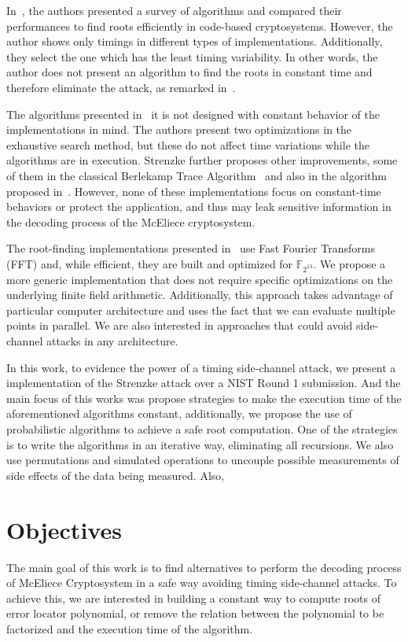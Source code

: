 In~\cite{strenzke2012fast}, the authors presented a survey of algorithms and compared their performances to find roots efficiently in code-based cryptosystems. However, the author shows only timings in different types of implementations. Additionally, they select the one which has the least timing variability. In other words, the author does not present an algorithm to find the roots in constant time and therefore eliminate the attack, as remarked in~\cite{strenzke2013efficiency}.

The algorithms presented in~\cite{strenzke2012fast} it is not designed with constant behavior of the implementations in mind. The authors present two optimizations in the exhaustive search method, but these do not affect time variations while the algorithms are in execution. Strenzke further proposes other improvements, some of them in the classical Berlekamp Trace Algorithm~\cite{berlekamp1970factoring} and also in the algorithm proposed in~\cite{fedorenko2002finding}. However, none of these implementations focus on constant-time behaviors or protect the application, and thus may leak sensitive information in the decoding process of the McEliece cryptosystem.

The root-finding implementations presented in~\cite{chou2017mcbits, bernstein2013mcbits} use Fast Fourier Transforms (FFT) and, while efficient, they are built and optimized for $\mathbb{F}_{2^{13}}$. We propose a more generic implementation that does not require specific optimizations on the underlying finite field arithmetic. Additionally, this approach takes advantage of particular computer architecture and uses the fact that we can evaluate multiple points in parallel. We are also interested in approaches that could avoid side-channel attacks in any architecture. 

In this work, to evidence the power of a timing side-channel attack, we present a implementation of the Strenzke attack over a NIST Round 1 submission. And the main focus of this works was propose strategies to make the execution time of the aforementioned algorithms constant, additionally, we propose the use of probabilistic algorithms to achieve a safe root computation. One of the strategies is to write the algorithms in an iterative way, eliminating all recursions. We also use permutations and simulated operations to uncouple possible measurements of side effects of the data being measured. Also, 

\section{Objectives}
The main goal of this work is to find alternatives to perform the decoding process of McEliece Cryptosystem in a safe way avoiding timing side-channel attacks. To achieve this, we are interested in building a constant way to compute roots of error locator polynomial, or remove the relation between the polynomial to be factorized and the execution time of the algorithm.


